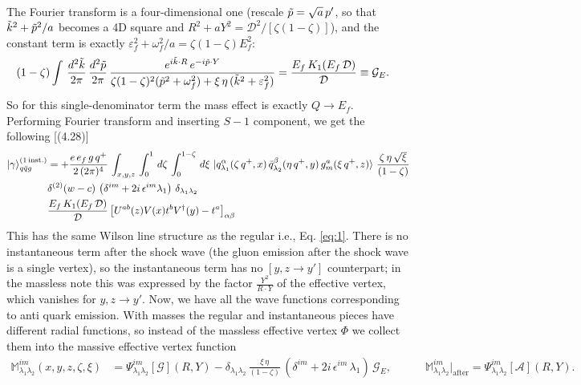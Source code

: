 \documentclass[9pt]{article}
\newcommand{\eps}{\varepsilon_{f}}           %
\newcommand{\om}{\omega_{f}}                 %
\newcommand{\Ef}{E_{f}}                      %
\newcommand{\GE}{\mathcal{G}_{E}}            %
\newcommand{\M}{\mathbb{M}}
\numberwithin{equation}{section}
\begin{document}
\begin{enumerate}
\begin{align}
\end{align}
The Fourier transform is a four-dimensional one (rescale $\Tilde{p}=\sqrt{a}\,p'$, so that $\Tilde{k}^{2}+\Tilde{p}^{2}/a$ becomes a 4D square and $R^{2}+aY^{2}=\mathcal{D}^{2}/[\zeta(1-\zeta)]$), and the constant term is exactly $\eps^{2}+\om^{2}/a = \zeta(1-\zeta)\Ef^{2}$:
\begin{align}\label{eq:GE}
    (1-\zeta)\int\, \frac{d^{2}\Tilde{k}}{2\pi}\, \frac{d^{2}\Tilde{p}}{2\pi}\,\frac{e^{i\Tilde{k}\cdot R}\,e^{-i\Tilde{p}\cdot Y}}{\zeta(1-\zeta)^{2}(\Tilde{p}^{2}+\om^{2})+\xi\,\eta\,(\Tilde{k}^{2}+\eps^{2})} & = \frac{\Ef\,K_{1}(\Ef\,\mathcal{D})}{\mathcal{D}} \equiv \GE .
\end{align}
So for this single-denominator term the mass effect is exactly $Q\rightarrow \Ef$. Performing Fourier transform and inserting $S-1$ component, we get the following [(4.28)]
\begin{align}
    \ket{\gamma}^{(1\,\text{inst.})}_{q\Bar{q}g} & = +\frac{e\,e_{f}\,g\,q^{+}}{2\,(2\pi)^{4}}\, \int_{x,y,z}\, \int_{0}^{1}\, d\zeta\, \int_{0}^{1-\zeta}\, d\xi\, \ket{q^{\alpha}_{\lambda_{1}}(\zeta\,q^{+},x)\,\Bar{q}^{\beta}_{\lambda_{2}}(\eta\,q^{+},y)\,g^{a}_{m}(\xi\,q^{+},z)}\, \frac{\zeta\,\eta\, \sqrt{\xi}}{(1-\zeta)}\notag \\ & \delta^{(2)}(w-c)\, \left(\delta^{im}+2i\,\epsilon^{im}\lambda_{1}\right)\,\delta_{\lambda_{1}\lambda_{2}}\notag \\ & \frac{\Ef\,K_{1}(\Ef\,\mathcal{D})}{\mathcal{D}} \left[U^{ab}(z)V(x)t^{b}V^{\dagger}(y)-t^{a}\right]_{\alpha\beta}
\end{align}
This has the same Wilson line structure as the regular i.e., Eq. \eqref{eq:1}. There is no instantaneous term after the shock wave (the gluon emission after the shock wave is a single vertex), so the instantaneous term has no $[y,z\rightarrow y']$ counterpart; in the massless note this was expressed by the factor $\frac{Y^{2}}{R\cdot Y}$ of the effective vertex, which vanishes for $y,z\rightarrow y'$. Now, we have all the wave functions corresponding to anti quark emission. With masses the regular and instantaneous pieces have different radial functions, so instead of the massless effective vertex $\Phi$ we collect them into the massive effective vertex function
\begin{align}\label{eq:Mdef}
    \M^{im}_{\lambda_{1}\lambda_{2}}(x,y,z,\zeta,\xi) & = \Psi^{im}_{\lambda_{1}\lambda_{2}}\!\left[\mathcal{G}\right](R,Y)-\delta_{\lambda_{1}\lambda_{2}}\,\frac{\xi\,\eta}{(1-\zeta)}\,\left(\delta^{im}+2i\,\epsilon^{im}\,\lambda_{1}\right)\,\GE, \hspace{3em} \M^{im}_{\lambda_{1}\lambda_{2}}\Big|_{\text{after}} = \Psi^{im}_{\lambda_{1}\lambda_{2}}\!\left[\mathcal{A}\right](R,Y).

\end{align}
\end{enumerate}
\end{document}
